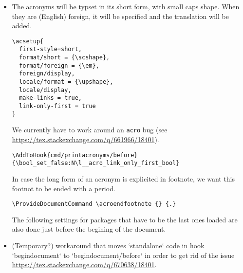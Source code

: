 \documentclass{letgut}
\begin{document}
\begin{itemize}
default set to \lstinline+subbibliography+.
\begin{lstlisting}
\NewCommandCopy{\__letgut_old_printbibliography}{
  \printbibliography
}
\RenewDocumentCommand {\printbibliography} { O{} } {
  \phantomsection
  \__letgut_old_printbibliography[#1]
  \bool_if:NT \g__letgut_included_files_attached_bool {
    \seq_map_inline:Nn \g__letgut_added_bib_resources_seq {\seq_gput_right:Nn \g__letgut_included_files_seq {#1}}
  }
}
\end{lstlisting}
 For printing the bibliography, we define two new bibheadings for the
structure levels \lstinline+\title+ and \lstinline+\subtitle+.
\begin{lstlisting}
\defbibheading{title}[\refname]{%
  \title{#1}}
\defbibheading{subtitle}[\refname]{%
  \subtitle{#1}}
\end{lstlisting}
\item The acronyms will be typset in its short form, with small caps shape. When they are
(English) foreign, it will be specified and the translation will be added.
\begin{lstlisting}
\acsetup{
  first-style=short,
  format/short = {\scshape},
  format/foreign = {\em},
  foreign/display,
  locale/format = {\upshape},
  locale/display,
  make-links = true,
  link-only-first = true
}
\end{lstlisting}

We currently have to work around an \lstinline+acro+ bug (see \url{https://tex.stackexchange.com/q/661966/18401}).

\begin{lstlisting}
\AddToHook{cmd/printacronyms/before}{\bool_set_false:N\l__acro_link_only_first_bool}
\end{lstlisting}

In case the long form of an acronym is explicited in footnote, we want this
footnot to be ended with a period.
\begin{lstlisting}
\ProvideDocumentCommand \acroendfootnote {} {.}
\end{lstlisting}

The following settings for packages that have to be the last ones loaded are
also done just before the begining of the document.

\item (Temporary?) workaround that moves `standalone` code in hook `begindocument`
to `begindocument/before` in order to get rid of the issue
\url{https://tex.stackexchange.com/q/670638/18401}.
\end{itemize}
\end{document}
